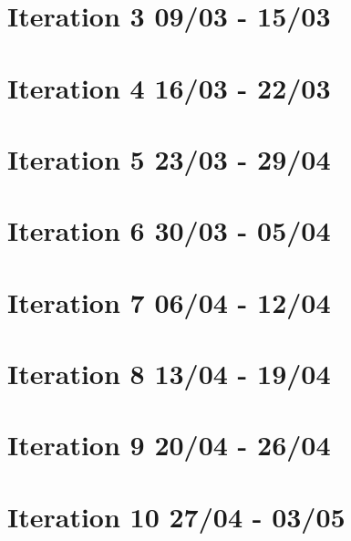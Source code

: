 \section{Iteration 3 09/03 - 15/03}


\section{Iteration 4 16/03 - 22/03}


\section{Iteration 5 23/03 - 29/04}


\section{Iteration 6 30/03 - 05/04}


\section{Iteration 7 06/04 - 12/04}


\section{Iteration 8 13/04 - 19/04}


\section{Iteration 9 20/04 - 26/04}


\section{Iteration 10 27/04 - 03/05}
